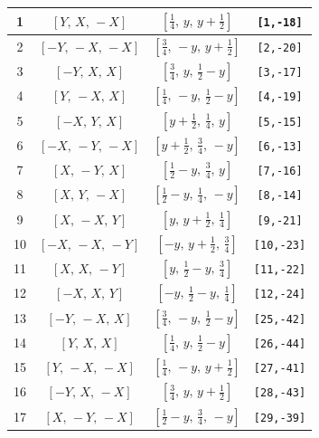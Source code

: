 \documentclass[fleqn,8pt]{jsarticle}
\begin{document}
\begin{longtable}{cccc}
1 & $\left[ Y,\, X,\, - X \right]$ & $\left[ \frac{1}{4},\, y,\, y + \frac{1}{2} \right]$ & {\tt [1,-18]} \\ \hline
2 & $\left[ - Y,\, - X,\, - X \right]$ & $\left[ \frac{3}{4},\, - y,\, y + \frac{1}{2} \right]$ & {\tt [2,-20]} \\ \hline
3 & $\left[ - Y,\, X,\, X \right]$ & $\left[ \frac{3}{4},\, y,\, \frac{1}{2} - y \right]$ & {\tt [3,-17]} \\ \hline
4 & $\left[ Y,\, - X,\, X \right]$ & $\left[ \frac{1}{4},\, - y,\, \frac{1}{2} - y \right]$ & {\tt [4,-19]} \\ \hline
5 & $\left[ - X,\, Y,\, X \right]$ & $\left[ y + \frac{1}{2},\, \frac{1}{4},\, y \right]$ & {\tt [5,-15]} \\ \hline
6 & $\left[ - X,\, - Y,\, - X \right]$ & $\left[ y + \frac{1}{2},\, \frac{3}{4},\, - y \right]$ & {\tt [6,-13]} \\ \hline
7 & $\left[ X,\, - Y,\, X \right]$ & $\left[ \frac{1}{2} - y,\, \frac{3}{4},\, y \right]$ & {\tt [7,-16]} \\ \hline
8 & $\left[ X,\, Y,\, - X \right]$ & $\left[ \frac{1}{2} - y,\, \frac{1}{4},\, - y \right]$ & {\tt [8,-14]} \\ \hline
9 & $\left[ X,\, - X,\, Y \right]$ & $\left[ y,\, y + \frac{1}{2},\, \frac{1}{4} \right]$ & {\tt [9,-21]} \\ \hline
10 & $\left[ - X,\, - X,\, - Y \right]$ & $\left[ - y,\, y + \frac{1}{2},\, \frac{3}{4} \right]$ & {\tt [10,-23]} \\ \hline
11 & $\left[ X,\, X,\, - Y \right]$ & $\left[ y,\, \frac{1}{2} - y,\, \frac{3}{4} \right]$ & {\tt [11,-22]} \\ \hline
12 & $\left[ - X,\, X,\, Y \right]$ & $\left[ - y,\, \frac{1}{2} - y,\, \frac{1}{4} \right]$ & {\tt [12,-24]} \\ \hline
13 & $\left[ - Y,\, - X,\, X \right]$ & $\left[ \frac{3}{4},\, - y,\, \frac{1}{2} - y \right]$ & {\tt [25,-42]} \\ \hline
14 & $\left[ Y,\, X,\, X \right]$ & $\left[ \frac{1}{4},\, y,\, \frac{1}{2} - y \right]$ & {\tt [26,-44]} \\ \hline
15 & $\left[ Y,\, - X,\, - X \right]$ & $\left[ \frac{1}{4},\, - y,\, y + \frac{1}{2} \right]$ & {\tt [27,-41]} \\ \hline
16 & $\left[ - Y,\, X,\, - X \right]$ & $\left[ \frac{3}{4},\, y,\, y + \frac{1}{2} \right]$ & {\tt [28,-43]} \\ \hline
17 & $\left[ X,\, - Y,\, - X \right]$ & $\left[ \frac{1}{2} - y,\, \frac{3}{4},\, - y \right]$ & {\tt [29,-39]} \\ \hline

\end{longtable}
\end{document}
